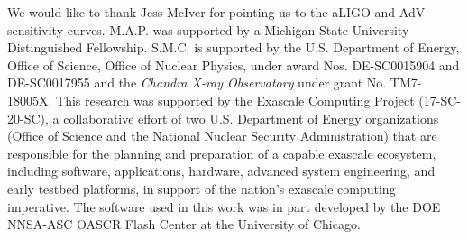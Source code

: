 \documentclass[twocolumn,times]{aastex62}  %
\begin{document}
\acknowledgements

We would like to thank Jess McIver for pointing us to the aLIGO and AdV sensitivity curves.  M.A.P. was supported by a Michigan State University Distinguished Fellowship. 
S.M.C. is supported by the U.S. Department of Energy, Office of Science, Office of Nuclear Physics,
under award Nos. DE-SC0015904 and DE-SC0017955 and the \textit{Chandra
X-ray Observatory} under grant No. TM7-18005X.
This research was supported by the Exascale Computing Project (17-SC-20-SC), a collaborative effort of two U.S. Department of Energy organizations (Office of Science and the National Nuclear Security Administration) that are responsible for the planning and preparation of a capable exascale ecosystem, including software, applications, hardware, advanced system engineering, and early testbed platforms, in support of the nation's exascale computing imperative.
The software used in this
work was in part developed by the DOE NNSA-ASC OASCR Flash Center at
the University of Chicago.  

    





\end{document}
